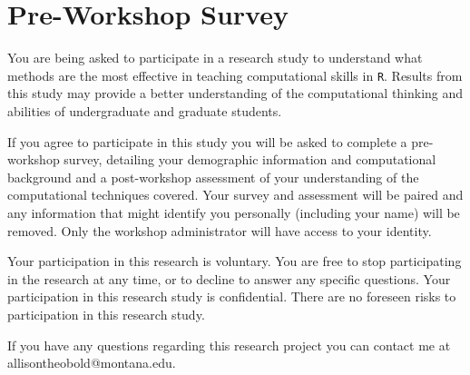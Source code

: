 \documentclass[12pt]{article}
\begin{document}
\def\spacingset#1{\renewcommand{\baselinestretch}%
{#1}\small\normalsize} \spacingset{1}

\section*{Pre-Workshop Survey}

You are being asked to participate in a research study to understand what methods are the most
effective in teaching computational skills in \texttt{R}. Results from this study may provide a better
understanding of the computational thinking and abilities of undergraduate and graduate students.

If you agree to participate in this study you will be asked to complete a pre-workshop survey, detailing
your demographic information and computational background and a post-workshop assessment of your
understanding of the computational techniques covered. Your survey and assessment will be paired and
any information that might identify you personally (including your name) will be removed. Only the
workshop administrator will have access to your identity.

Your participation in this research is voluntary. You are free to stop participating in the research at any
time, or to decline to answer any specific questions. Your participation in this research study is
confidential. There are no foreseen risks to participation in this research study.

If you have any questions regarding this research project you can contact me at \newline allisontheobold@montana.edu.
\end{document}
